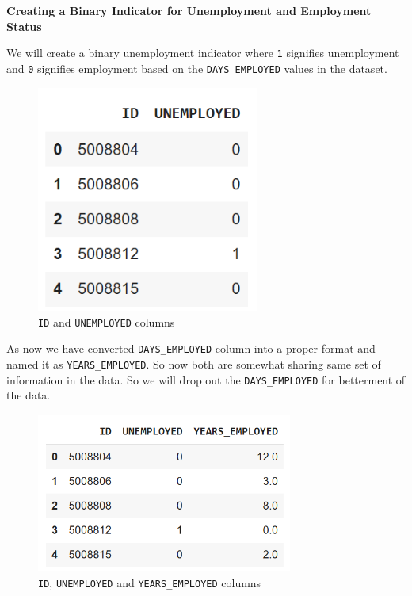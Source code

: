 \documentclass[12pt]{report}
\begin{document}
    {\bfseries Creating a Binary Indicator for Unemployment and Employment Status}

    We will create a binary unemployment indicator where \texttt{1} signifies unemployment and \texttt{0} signifies employment based on the \texttt{DAYS\_EMPLOYED} values in the dataset.

    \begin{figure}[h!]
        \centering
        \includegraphics[width=0.65\textwidth]{resources/pic/‘ID’ and ‘UNEMPLOYED’ columns.png}
        \caption{\texttt{ID} and \texttt{UNEMPLOYED} columns}
        \label{ID and UNEMPLOYED columns}
    \end{figure}

    As now we have converted \texttt{DAYS\_EMPLOYED} column into a proper format and named it as \texttt{YEARS\_EMPLOYED}. So now both are somewhat sharing same set of information in the data. So we will drop out the \texttt{DAYS\_EMPLOYED} for betterment of the data.

    \begin{figure}[h!]
        \centering
        \includegraphics[width=0.75\textwidth]{resources/pic/‘ID’, ‘UNEMPLOYED’ and ‘YEARS_EMPLOYED’ columns.png}
        \caption{\texttt{ID}, \texttt{UNEMPLOYED} and \texttt{YEARS\_EMPLOYED} columns}
        \label{ID, UNEMPLOYED and YEARS EMPLOYED columns}
    \end{figure}
\end{document}
